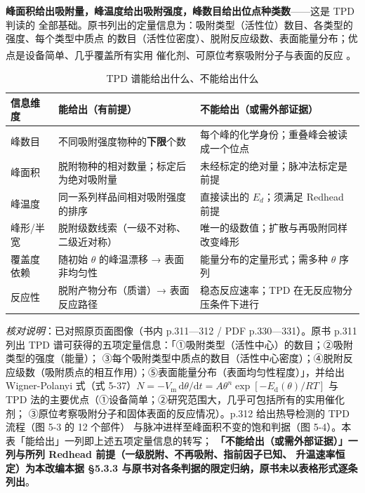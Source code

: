 \begin{principle}
\textbf{峰面积给出吸附量，峰温度给出吸附强度，峰数目给出位点种类数}——这是 TPD 判读的
全部基础。原书列出的定量信息为：吸附类型（活性位）数目、各类型的强度、每个类型中质点
的数目（活性位密度）、脱附反应级数、表面能量分布；优点是设备简单、几乎覆盖所有实用
催化剂、可原位考察吸附分子与表面的反应
\textsuperscript{}。
\end{principle}

\begin{table}[htbp]
\centering
\caption{TPD 谱能给出什么、不能给出什么}
\label{tab:ch05-tpd}
{\srcsize
\begin{tabularx}{\columnwidth}{@{}lXX@{}}
\toprule
信息维度 & 能给出（有前提） & 不能给出（或需外部证据） \\
\midrule
峰数目 & 不同吸附强度物种的\textbf{下限}个数 & 每个峰的化学身份；重叠峰会被读成一个位点 \\
峰面积 & 脱附物种的相对数量；标定后为绝对吸附量 & 未经标定的绝对量；脉冲法标定是前提 \\
峰温度 & 同一系列样品间相对吸附强度的排序 & 直接读出的 $E_d$；须满足 Redhead 前提 \\
峰形/半宽 & 脱附级数线索（一级不对称、二级近对称） & 唯一的级数值；扩散与再吸附同样改变峰形 \\
覆盖度依赖 & 随初始 $\theta$ 的峰温漂移 → 表面非均匀性 & 能量分布的定量形式；需多种 $\theta$ 序列 \\
反应性 & 脱附产物分布（质谱）→ 表面反应路径 & 稳态反应速率；TPD 在无反应物分压条件下进行 \\
\bottomrule
\end{tabularx}}
\end{table}

\emph{核对说明}：已对照原页面图像（书内 p.311—312 / PDF p.330—331）。原书
p.311 列出 TPD 谱可获得的五项定量信息：「①吸附类型（活性中心）的数目；②吸附类型的强度（能量）；
③每个吸附类型中质点的数目（活性中心密度）；④脱附反应级数（吸附质点的相互作用）；⑤表面能量分布（表面均匀性程度）」，并给出 Wigner-Polanyi 式（式 5-37）$N=-V_{\mathrm m}\,\mathrm
d\theta/\mathrm dt=A\theta^{n}\exp[-E_{\mathrm
d}(\theta)/RT]$ 与 TPD 法的主要优点（①设备简单；②研究范围大，几乎可包括所有的实用催化剂；
③原位考察吸附分子和固体表面的反应情况）。p.312 给出热导检测的 TPD 流程（图 5-3 的 12 个部件）
与脉冲进样至峰面积不变的饱和判据（图 5-4）。本表「能给出」一列即上述五项定量信息的转写；
\textbf{「不能给出（或需外部证据）」一列与所列 Redhead 前提（一级脱附、不再吸附、指前因子已知、
升温速率恒定）为本改编本据 §5.3.3 与原书对各条判据的限定归纳，原书未以表格形式逐条列出}。


